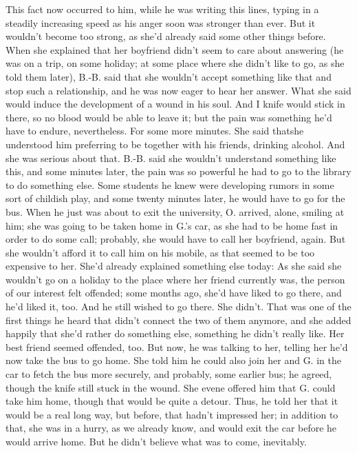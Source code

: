 This fact now occurred to him, while he was writing this lines, typing in a steadily increasing speed as his anger soon was stronger than ever. 
But it wouldn't become too strong, as she'd already said some other things before. When she explained that her boyfriend didn't seem to care about answering (he was on a trip, on some holiday; at some place where she didn't like to go, as she told them later), B.-B. said that she wouldn't accept something like that and stop such a relationship, and he was now eager to hear her answer. What she said would induce the development of a wound in his soul. 
And I knife would stick in there, so no blood would be able to leave it; but the pain was something he'd have to endure, nevertheless. 
For some more minutes. 
She said thatshe understood him preferring to be together with his friends, drinking alcohol. 
And she was serious about that. 
B.-B. said she wouldn't understand something like this, and some minutes later, the pain was so powerful he had to go to the library to do something else. 
Some students he knew were developing rumors in some sort of childish play, and some twenty minutes later, he would have to go for the bus. When he just was about to exit the university, O. arrived, alone, smiling at him; she was going to be taken home in G.'s car, as she had to be home fast in order to do some call; probably, she would have to call her boyfriend, again. 
But she wouldn't afford it to call him on his mobile, as that seemed to be too expensive to her. 
She'd already explained something else today: As she said she wouldn't go on a holiday to the place where her friend currently was, the person of our interest felt offended; some months ago, she'd have liked to go there, and he'd liked it, too. 
And he still wished to go there. 
She didn't. 
That was one of the first things he heard that didn't connect the two of them anymore, and she added happily that she'd rather do something else, something he didn't really like. 
Her best friend seemed offended, too. 
But now, he was talking to her, telling her he'd now take the bus to go home. 
She told him he could also join her and G. in the car to fetch the bus more securely, and probably, some earlier bus; he agreed, though the knife still stuck in the wound. 
She evene offered him that G. could take him home, though that would be quite a detour. 
Thus, he told her that it would be a real long way, but before, that hadn't impressed her; in addition to that, she was in a hurry, as we already know, and would exit the car before he would arrive home. 
But he didn't believe what was to come, inevitably. 
